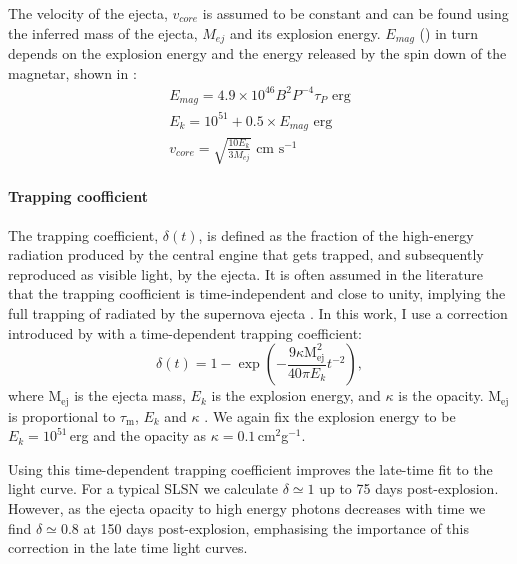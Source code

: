 The velocity of the ejecta, $v_{core}$ is assumed to be constant and can be found using the inferred mass of the ejecta, $M_{ej}$ and its explosion energy. $E_{mag}$ () in turn depends on the explosion energy and the energy released by the spin down of the magnetar, shown in :
\begin{align}
\label{Eq:Emag}
E_{mag} = 4.9\times10^{46} B^2 P^{-4} \tau_{P}  \text{ erg} \\
E_k = 10^{51} + 0.5 \times E_{mag} \text{ erg}\\
\label{Eq:vcore}
v_{core} =  \sqrt{\frac{10 E_{k}}{3 M_{ej}}} \text{ cm s}^{-1}
\end{align}

\paragraph{Trapping coofficient}
The trapping coefficient, $\delta(t)$, is defined as the fraction of the high-energy radiation produced by the central engine that gets trapped, and subsequently reproduced as visible light, by the ejecta. It is often assumed in the literature that the trapping coofficient is time-independent and close to unity, implying the full trapping of radiated by the supernova ejecta \citep{Inserra2013,Papadopoulos2015,Nicholl2015}. In this work, I use a correction introduced by \cite{Wang2015} with a time-dependent trapping coefficient:
\begin{equation}
\delta(t) = 1 - \exp\left({-\frac{9\kappa \mathrm{M}_{\mathrm{ej}}^{2}}{40\pi  E_k} t^{-2}} \right),
\label{Eq:Wang}
\end{equation}
\noindent where $\mathrm{M}_{\mathrm{ej}}$ is the ejecta mass, $E_k$ is the explosion energy, and $\kappa$ is the opacity. $\mathrm{M}_{\mathrm{ej}}$ is proportional to $\tau_\mathrm{m}$, $E_k$ and $\kappa$ \citep{Inserra2013}. We again fix the explosion energy to be $E_k = 10^{51}$\,erg and the opacity as $\kappa = 0.1$\,cm$^2$g$^{-1}$.

Using this time-dependent trapping coefficient improves the late-time fit to the light curve. For a typical SLSN we calculate $\delta \simeq 1$ up to 75 days post-explosion. However, as the ejecta opacity to high energy photons decreases with time we find $\delta \simeq 0.8$ at 150 days post-explosion, emphasising the importance of this correction in the late time light curves.

